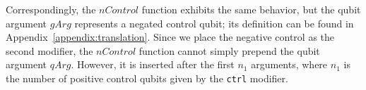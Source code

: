 Correspondingly, the $nControl$ function exhibits the same behavior, but the qubit argument $gArg$ represents a negated control qubit; its definition can be found in Appendix~\ref{appendix:translation}. Since we place the negative control as the second modifier, the $nControl$ function cannot simply prepend the qubit argument $qArg$. However, it is inserted after the first $n_1$ arguments, where $n_1$ is the number of positive control qubits given by the \texttt{ctrl} modifier.